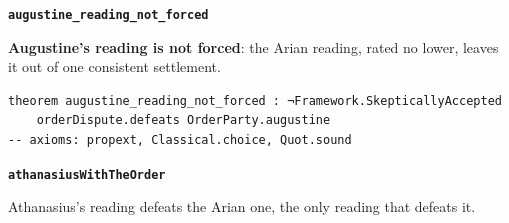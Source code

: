 \documentclass[11pt,paper=\testimonypaper,DIV=13,parskip=false]{scrartcl}
\begin{document}
\par\medskip\noindent\textbf{\texttt{augustine\_\allowbreak{}reading\_\allowbreak{}not\_\allowbreak{}forced}}\par\nobreak\noindent
\textbf{Augustine’s reading is not forced}: the Arian reading, rated no lower, leaves it out of one consistent settlement.

{\small\begin{verbatim}
theorem augustine_reading_not_forced : ¬Framework.SkepticallyAccepted
    orderDispute.defeats OrderParty.augustine
-- axioms: propext, Classical.choice, Quot.sound
\end{verbatim}}
\par\medskip\noindent\textbf{\texttt{athanasius\allowbreak{}With\allowbreak{}The\allowbreak{}Order}}\par\nobreak\noindent
Athanasius’s reading defeats the Arian one, the only reading that defeats it.
\end{document}
